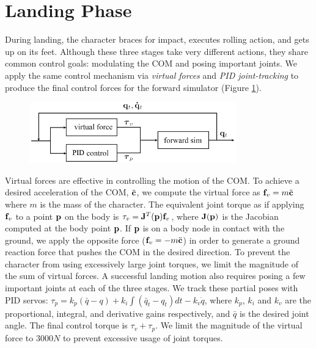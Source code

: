 \section{Landing Phase}
\label{sec:landing_landing}
During landing, the character braces for impact, executes rolling
action, and gets up on its feet. Although these three stages take very
different actions, they share common control goals: modulating the COM
and posing important joints.  We apply the same control mechanism via
\emph{virtual forces} and \emph{PID joint-tracking} to produce the
final control forces for the forward simulator (Figure
\ref{fig:landing_landingOverview}).

\begin{figure}[htbp]
\center
  \includegraphics[width=0.8\textwidth]{images/landingOverview}
  \caption{}
 \label{fig:landing_landingOverview}
\end{figure}

Virtual forces are effective in controlling the motion of the COM. To
achieve a desired acceleration of the COM, $\ddot{\mathbf{c}}$, we compute
the virtual force as $\mathbf{f}_v = m \ddot{\mathbf{c}}$ where $m$ is the mass of the
character. The equivalent joint torque as if applying $\mathbf{f}_v$ to a
point $\mathbf{p}$ on the body is $\tau_v = \mathbf{J}^T (\mathbf{p}) \mathbf{f}_v$,
where $\mathbf{J}(\mathbf{p})$ is the Jacobian computed at the body point
$\mathbf{p}$.
If $\mathbf{p}$ is on a body node in contact with the ground, 
we apply the opposite force ($\mathbf{f}_v = -m \ddot{\mathbf{c}}$) in order to
generate a ground reaction force that pushes the COM in the desired direction.
To prevent the character from using excessively large joint
torques, we limit the magnitude of the sum of virtual forces.  A
successful landing motion also requires posing a few important joints
at each of the three stages. We track these partial poses with PID
servos: $\tau_p = k_p (\bar{q} - q) + k_i \int (\bar{q}_t - q_t) dt -
k_v \dot{q}$, where $k_p$, $k_i$ and $k_v$ are the proportional,
integral, and derivative gains respectively, and $\bar{q}$ is the
desired joint angle.  The final control torque is $\tau_v+\tau_p$.
We limit the magnitude of the virtual force to $3000N$ to prevent
excessive usage of joint torques.



